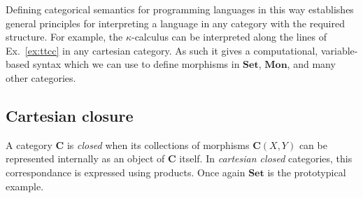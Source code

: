 \documentclass[draft,11pt]{report}
\theoremstyle{definition}
\begin{document}
Defining categorical semantics for programming languages in this way
establishes general principles
for interpreting a language in any category
with the required structure.
For example,
the $\kappa$-calculus
\citep{kappa}
can be interpreted
along the lines of Ex.~\ref{ex:ttcc}
in any cartesian category.
As such it gives a computational,
variable-based syntax
which we can use to define morphisms
in $\mathbf{Set}$, $\mathbf{Mon}$,
and many other categories.


\subsection{Cartesian closure} %

A category $\mathbf{C}$ is \emph{closed} when
its collections of morphisms $\mathbf{C}(X, Y)$
can be represented internally as an object of $\mathbf{C}$ itself.
In \emph{cartesian closed} categories,
this correspondance is expressed using products.
Once again $\mathbf{Set}$ is the prototypical example.
\end{document}
